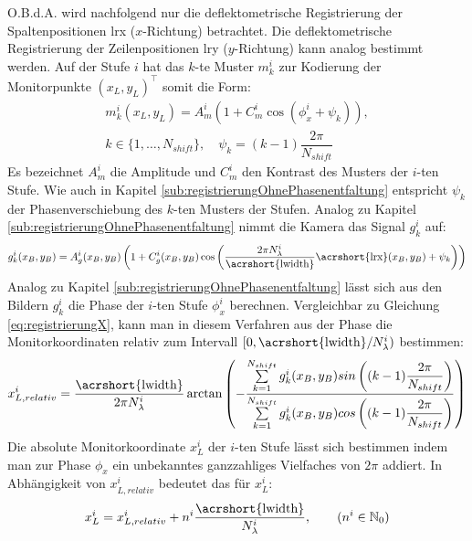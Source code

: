 \p
O.B.d.A. wird nachfolgend nur die deflektometrische Registrierung der Spaltenpositionen \acrshort{lrx} ($x$-Richtung) betrachtet.
Die deflektometrische Registrierung der Zeilenpositionen \acrshort{lry} ($y$-Richtung) kann analog bestimmt werden.
Auf der Stufe $i$ hat das $k$-te Muster $m_k^i$ zur Kodierung der Monitorpunkte $(x_L, y_L)^\top$ somit die Form:
%
\begin{equation}\label{eq:monitormuster_mehrstufig}
	\begin{gathered}	
		m_k^i(x_L,y_L) = A_m^i \left(1 + C_m^i \cos \left(\phi_x^i + \psi_k\right)\right),\\
		k \in \lbrace 1,\ldots,N_{shift}\rbrace,
		\quad
		\psi_k = (k - 1)\dfrac{2\pi}{N_{shift}}
	\end{gathered}
\end{equation}
%
Es bezeichnet $A_m^i$ die Amplitude und $C_m^i$ den Kontrast des Musters der $i$-ten Stufe.
Wie auch in Kapitel \ref{sub:registrierungOhnePhasenentfaltung} entspricht $\psi_k$ der Phasenverschiebung des $k$-ten Musters der Stufen.
Analog zu Kapitel \ref{sub:registrierungOhnePhasenentfaltung} nimmt die Kamera das Signal $g_k^i$ auf:
%
\begin{equation}\label{eq:kamerabild_mehrstufig}
	g_k^i(x_B, y_B) = A_g^i(x_B, y_B) \left(1 + C_g^i(x_B, y_B) \cos \left(\dfrac{2\pi N_\lambda^i}{\text{\acrshort{lwidth}}}\text{\acrshort{lrx}}(x_B, y_B) + \psi_k\right)\right)
\end{equation}
%
Analog zu Kapitel \ref{sub:registrierungOhnePhasenentfaltung} lässt sich aus den Bildern $g_k^i$ die Phase der $i$-ten Stufe $\phi_x^i$ berechnen.
Vergleichbar zu Gleichung \ref{eq:registrierungX}, kann man in diesem Verfahren aus der Phase die Monitorkoordinaten relativ zum Intervall $[0,\text{\acrshort{lwidth}}/N_\lambda^i)$ bestimmen:
%
\begin{equation}\label{eq:registrierungX_relativ}
	x_{L,relativ}^i =
	\dfrac{\text{\acrshort{lwidth}}}{2\pi N_\lambda^i}
	\arctan 
	\left( 
		-\dfrac
		{\sum\limits_{k=1}^{N_{shift}} g_k^i(x_B, y_B) sin\left((k - 1)\dfrac{2\pi}{N_{shift}}\right)}
		{\sum\limits_{k=1}^{N_{shift}} g_k^i(x_B, y_B) cos\left((k - 1)\dfrac{2\pi}{N_{shift}}\right)}
	\right)
\end{equation}
%
Die absolute Monitorkoordinate $x_L^i$ der $i$-ten Stufe lässt sich bestimmen indem man zur Phase $\phi_x$ ein unbekanntes ganzzahliges Vielfaches von $2\pi$ addiert.
In Abhängigkeit von $x_{L,relativ}^i$ bedeutet das für $x_L^i$:
%
\begin{equation}\label{registrierungX_absolut}
	x_L^i = x_{L,relativ}^i + n^i \dfrac{\text{\acrshort{lwidth}}}{N_\lambda^i},
	\qquad
	(n^i \in \mathbb{N}_0)
\end{equation}
